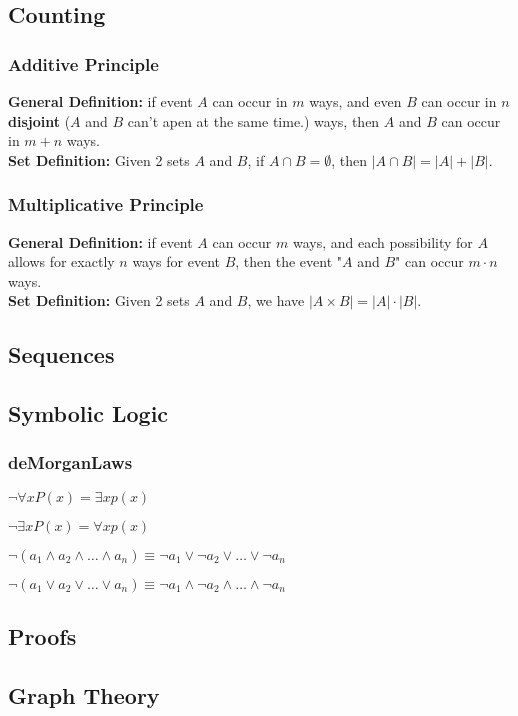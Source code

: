 \documentclass[5pt]{article}
\begin{document}
\begin{multicols}{2}
\subsection{Counting}
\subsubsection{Additive Principle}
\textbf{General Definition:} 
if event $A$ can occur in $m$ ways, and even $B$ can occur in $n$ \textbf{disjoint} ($A$ and $B$ can't apen at the same time.) ways, then $A$ and $B$ can occur in $m+n$ ways.\\   
\textbf{Set Definition:} Given 2 sets $A$ and $B$, if $A\cap B =\emptyset$, then $|A\cap B| = |A| + |B|$.


\subsubsection{Multiplicative Principle}
\textbf{General Definition:} if event $A$ can occur $m$ ways, and each possibility for $A$ allows for exactly $n$ ways for event $B$, then the event "$A$ and $B$" can occur $m\cdot n$ ways.\\
\textbf{Set Definition:} Given 2 sets $A$ and $B$, we have $|A\times B|=|A|\cdot|B|$.


\subsection{Sequences}

\subsection{Symbolic Logic}
\subsubsection{deMorganLaws}
\begin{itemize*}
    \item $\lnot\forall xP(x)=\exists xp(x)$
    \item $\lnot\exists xP(x)=\forall xp(x)$
    \item $\lnot(a_1\land a_2\land \dots\land a_n)\equiv \lnot a_1\lor \lnot a_2\lor \dots\lor \lnot a_n$
    \item $\lnot(a_1\lor a_2\lor \dots\lor a_n)\equiv \lnot a_1\land \lnot a_2\land \dots\land \lnot a_n$
\end{itemize*}


\subsection{Proofs}

\subsection{Graph Theory}



\end{multicols}
\end{document}

